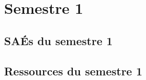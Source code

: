 \documentclass[10pt,lualatex,french]{article}
\begin{document}
%
%

%
%


%
\section{Semestre 1}
\def\sem{A}

\subsection{SAÉs du semestre 1}
%
\subsection{Ressources du semestre 1}
%
%
%
%
%
%
\newpage
%
%
\end{document}

